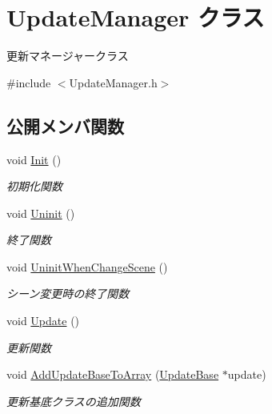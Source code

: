\hypertarget{class_update_manager}{}\section{Update\+Manager クラス}
\label{class_update_manager}


更新マネージャークラス  




{\ttfamily \#include $<$Update\+Manager.\+h$>$}

\subsection*{公開メンバ関数}
\begin{DoxyCompactItemize}
\item 
void \mbox{\hyperlink{class_update_manager_a7b0a2a3bf51d4fcb83fd25fe642fc66b}{Init}} ()
\begin{DoxyCompactList}\small\item\em 初期化関数 \end{DoxyCompactList}\item 
void \mbox{\hyperlink{class_update_manager_a389f9047e882de587eb4def0c691909d}{Uninit}} ()
\begin{DoxyCompactList}\small\item\em 終了関数 \end{DoxyCompactList}\item 
void \mbox{\hyperlink{class_update_manager_a2e0a6b1a620ba620783d929e532b6148}{Uninit\+When\+Change\+Scene}} ()
\begin{DoxyCompactList}\small\item\em シーン変更時の終了関数 \end{DoxyCompactList}\item 
void \mbox{\hyperlink{class_update_manager_ac4bdd39d106c7e6b505fe9a0c55e50de}{Update}} ()
\begin{DoxyCompactList}\small\item\em 更新関数 \end{DoxyCompactList}\item 
void \mbox{\hyperlink{class_update_manager_afe4b39d94cde8294cc273cde32788eaa}{Add\+Update\+Base\+To\+Array}} (\mbox{\hyperlink{class_update_base}{Update\+Base}} $\ast$update)
\begin{DoxyCompactList}\small\item\em 更新基底クラスの追加関数 \end{DoxyCompactList}\item 

\end{DoxyCompactItemize}
